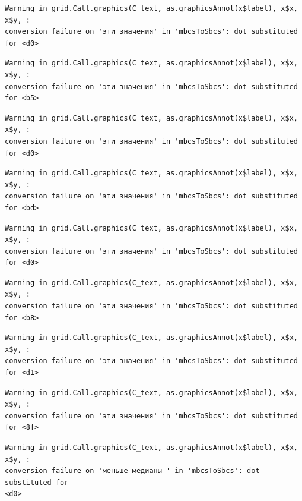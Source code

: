 \documentclass[
  letterpaper,
  DIV=11,
  numbers=noendperiod]{scrreprt}
\theoremstyle{definition}
\theoremstyle{remark}
\begin{document}
\begin{verbatim}
Warning in grid.Call.graphics(C_text, as.graphicsAnnot(x$label), x$x, x$y, :
conversion failure on 'эти значения' in 'mbcsToSbcs': dot substituted for <d0>
\end{verbatim}

\begin{verbatim}
Warning in grid.Call.graphics(C_text, as.graphicsAnnot(x$label), x$x, x$y, :
conversion failure on 'эти значения' in 'mbcsToSbcs': dot substituted for <b5>
\end{verbatim}

\begin{verbatim}
Warning in grid.Call.graphics(C_text, as.graphicsAnnot(x$label), x$x, x$y, :
conversion failure on 'эти значения' in 'mbcsToSbcs': dot substituted for <d0>
\end{verbatim}

\begin{verbatim}
Warning in grid.Call.graphics(C_text, as.graphicsAnnot(x$label), x$x, x$y, :
conversion failure on 'эти значения' in 'mbcsToSbcs': dot substituted for <bd>
\end{verbatim}

\begin{verbatim}
Warning in grid.Call.graphics(C_text, as.graphicsAnnot(x$label), x$x, x$y, :
conversion failure on 'эти значения' in 'mbcsToSbcs': dot substituted for <d0>
\end{verbatim}

\begin{verbatim}
Warning in grid.Call.graphics(C_text, as.graphicsAnnot(x$label), x$x, x$y, :
conversion failure on 'эти значения' in 'mbcsToSbcs': dot substituted for <b8>
\end{verbatim}

\begin{verbatim}
Warning in grid.Call.graphics(C_text, as.graphicsAnnot(x$label), x$x, x$y, :
conversion failure on 'эти значения' in 'mbcsToSbcs': dot substituted for <d1>
\end{verbatim}

\begin{verbatim}
Warning in grid.Call.graphics(C_text, as.graphicsAnnot(x$label), x$x, x$y, :
conversion failure on 'эти значения' in 'mbcsToSbcs': dot substituted for <8f>
\end{verbatim}

\begin{verbatim}
Warning in grid.Call.graphics(C_text, as.graphicsAnnot(x$label), x$x, x$y, :
conversion failure on 'меньше медианы ' in 'mbcsToSbcs': dot substituted for
<d0>
\end{verbatim}
\end{document}

